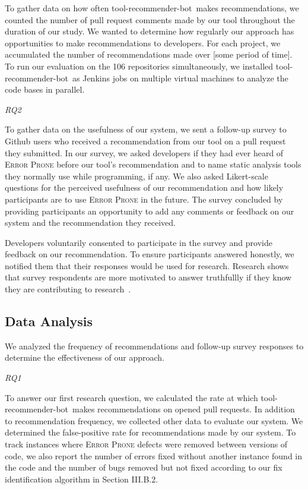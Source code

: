 \documentclass[conference]{IEEEtran}
\newcommand{\tool}{tool-recommender-bot}
\newcommand{\pseudosubsection}[1]{\vspace{2mm} {\it #1}}
\begin{document}
To gather data on how often \tool~makes recommendations, we counted the number of pull request comments made by our tool throughout the duration of our study. We wanted to determine how regularly our approach has opportunities to make recommendations to developers. For each project, we accumulated the number of recommendations made over [some period of time]. To run our evaluation on the 106 repositories simultaneously, we installed \tool~as Jenkins jobs on multiple virtual machines to analyze the code bases in parallel. 

\pseudosubsection{RQ2}

To gather data on the usefulness of our system, we sent a follow-up survey to Github users who received a recommendation from our tool on a pull request they submitted. In our survey, we asked developers if they had ever heard of \textsc{Error Prone} before our tool's recommendation and to name static analysis tools they normally use while programming, if any. We also asked Likert-scale questions for the perceived usefulness of our recommendation and how likely participants are to use \textsc{Error Prone} in the future. The survey concluded by providing participants an opportunity to add any comments or feedback on our system and the recommendation they received.

Developers voluntarily consented to participate in the survey and provide feedback on our recommendation. To ensure participants answered honestly, we notified them that their responses would be used for research. Research shows that survey respondents are more motivated to answer truthfullly if they know they are contributing to research~\cite{Krosnick1991Research}.

\subsection{Data Analysis}

We analyzed the frequency of recommendations and follow-up survey responses to determine the effectiveness of our approach.

\pseudosubsection{RQ1}

To answer our first research question, we calculated the rate at which \tool~makes recommendations on opened pull requests. 
In addition to recommendation frequency, we collected other data to evaluate our system. We determined the false-positive rate for recommendations made by our system. To track instances where \textsc{Error Prone} defects were removed between versions of code, we also report the number of errors fixed without another instance found in the code and the number of bugs removed but not fixed according to our fix identification algorithm in Section III.B.2.
\end{document}
